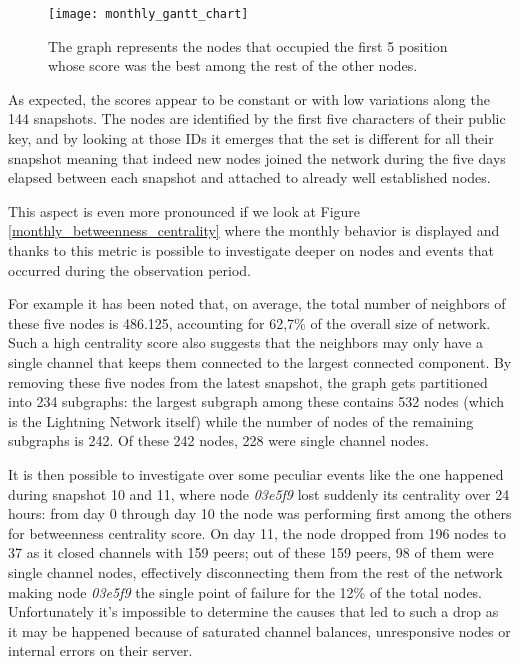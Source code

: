 	\begin{figure}
		\centering
		\texttt{[image: monthly\_gantt\_chart]}
		\caption{The graph represents the nodes that occupied the first 5 position whose score was the best among the rest of the other nodes.}
		\label{monthly_gantt}
	\end{figure}

	As expected, the scores appear to be constant or with low variations along the 144 snapshots. The nodes are identified by the first five characters of their public key, and by looking at those IDs it emerges that the set is different for all their snapshot meaning that indeed new nodes joined the network during the five days elapsed between each snapshot and attached to already well established nodes. 
	
	This aspect is even more pronounced if we look at Figure \ref{monthly_betweenness_centrality} where the monthly behavior is displayed and thanks to this metric is possible to investigate deeper on nodes and events that occurred during the observation period. 
	
	For example it has been noted that, on average, the total number of neighbors of these five nodes is 486.125, accounting for 62,7\% of the overall size of network. Such a high centrality score also suggests that the neighbors may only have a single channel that keeps them connected to the largest connected component. By removing these five nodes from the latest snapshot, the graph gets partitioned into 234 subgraphs: the largest subgraph among these contains 532 nodes (which is the Lightning Network itself) while the number of nodes of the remaining subgraphs is 242. Of these 242 nodes, 228 were single channel nodes.

	It is then possible to investigate over some peculiar events like the one happened during snapshot 10 and 11, where node \textit{03e5f9} lost suddenly its centrality over 24 hours: 
	from day 0 through day 10 the node was performing first among the others for betweenness centrality score. On day 11, the node dropped from 196 nodes to 37 as it closed channels with 159 peers; out of these 159 peers, 98 of them were single channel nodes, effectively disconnecting them from the rest of the network making node \textit{03e5f9} the single point of failure for the 12\% of the total nodes. Unfortunately it's impossible to determine the causes that led to such a drop as it may be happened because of saturated channel balances, unresponsive nodes or internal errors on their server.
	
